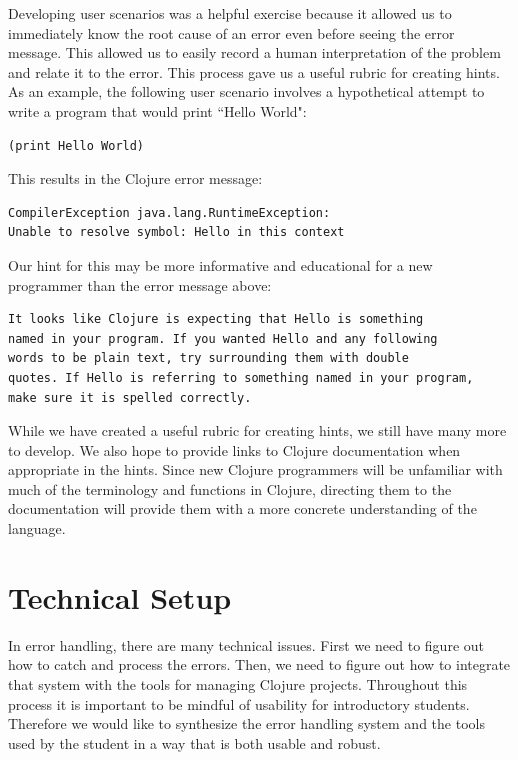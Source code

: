 \documentclass[12pt]{article}
\begin{document}
Developing user scenarios was a helpful exercise because it allowed us to immediately 
know the root cause of an error even before seeing the error message.
This allowed us to easily record a human interpretation of the problem and relate it to 
the error. This process gave us a useful rubric for creating hints. As an example, the 
following user scenario involves a hypothetical attempt to write a program that would 
print ``Hello World":

\begin{verbatim}
(print Hello World)
\end{verbatim}

This results in the Clojure error message:
\begin{verbatim}
CompilerException java.lang.RuntimeException:
Unable to resolve symbol: Hello in this context
\end{verbatim}

Our hint for this may be more informative and educational for a new programmer than the 
error message above:

\begin{verbatim}
It looks like Clojure is expecting that Hello is something
named in your program. If you wanted Hello and any following
words to be plain text, try surrounding them with double
quotes. If Hello is referring to something named in your program,
make sure it is spelled correctly.
\end{verbatim}

While we have created a useful rubric for creating hints, we still have many more to 
develop.
We also hope to provide links to Clojure documentation when appropriate in the hints.
Since new Clojure programmers will be unfamiliar with much of the terminology and 
functions in Clojure, directing them to the documentation will provide them with a more 
concrete understanding of the language.

\section{Technical Setup}\label{sec:technical}
In error handling, there are many technical issues. First we need to figure out how to 
catch and process the errors. Then, we need to figure out how to integrate that system 
with the tools for managing Clojure projects. Throughout this process it is important to 
be mindful of usability for introductory students. Therefore we would like to synthesize 
the error handling system and the tools used by the student in a way that is both usable 
and robust.
\end{document}
